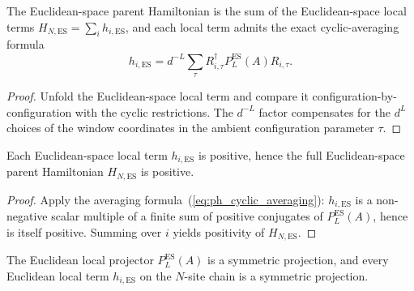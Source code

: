 \begin{lemma}
    \label{lem:local_term_es_average}
    \leanok
    The Euclidean-space parent Hamiltonian is the sum of the Euclidean-space
    local terms $H_{N,\mathrm{ES}} = \sum_i h_{i,\mathrm{ES}}$, and each local
    term admits the exact cyclic-averaging formula
    \begin{equation}\label{eq:ph_cyclic_averaging}
        h_{i,\mathrm{ES}}
        = d^{-L} \sum_{\tau} R_{i,\tau}^{\dagger} P_L^{\mathrm{ES}}(A) R_{i,\tau}.
    \end{equation}
\end{lemma}

\begin{proof}
    \leanok
    Unfold the Euclidean-space local term and compare it
    configuration-by-configuration with the cyclic restrictions. The $d^{-L}$
    factor compensates for the $d^L$ choices of the window coordinates in the
    ambient configuration parameter $\tau$.
\end{proof}

\begin{lemma}
    \label{lem:transported_es_positive}
    \leanok
    Each Euclidean-space local term $h_{i,\mathrm{ES}}$ is positive, hence the
    full Euclidean-space parent Hamiltonian $H_{N,\mathrm{ES}}$ is positive.
\end{lemma}

\begin{proof}
    \leanok
    Apply the averaging formula~(\ref{eq:ph_cyclic_averaging}): $h_{i,\mathrm{ES}}$ is a non-negative scalar
    multiple of a finite sum of positive conjugates of $P_L^{\mathrm{ES}}(A)$, hence is
    itself positive. Summing over $i$ yields positivity of $H_{N,\mathrm{ES}}$.
\end{proof}

\begin{lemma}
    \label{lem:transported_es_local_projections}
    \leanok
    The Euclidean local projector $P_L^{\mathrm{ES}}(A)$ is a symmetric projection, and
    every Euclidean local term $h_{i,\mathrm{ES}}$ on the $N$-site chain is a
    symmetric projection.
\end{lemma}

